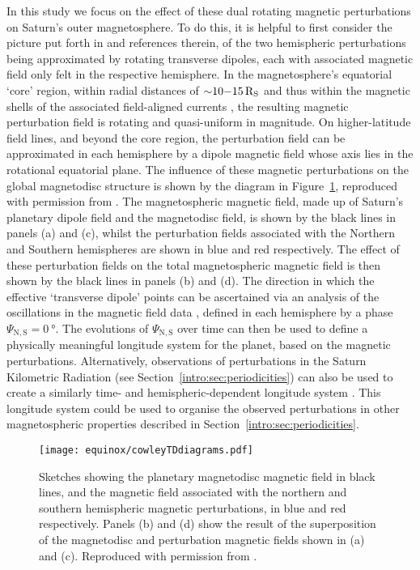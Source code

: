 In this study we focus on the effect of these dual rotating magnetic perturbations on Saturn's outer magnetosphere. To do this, it is helpful to first consider the picture put forth in \citet{andrews2010, provan2011} and references therein, of the two hemispheric perturbations being approximated by rotating transverse dipoles, each with associated magnetic field only felt in the respective hemisphere. In the magnetosphere's equatorial `core' region, within radial distances of ${\sim}10{\--}\SI{15}{R_S}$ and thus within the magnetic shells of the associated field-aligned currents \citep[e.g.][]{southwood2007}, the resulting magnetic perturbation field is rotating and quasi-uniform in magnitude. On higher-latitude field lines, and beyond the core region, the perturbation field can be approximated in each hemisphere by a dipole magnetic field whose axis lies in the rotational equatorial plane. The influence of these magnetic perturbations on the global magnetodisc structure is shown by the diagram in Figure~\ref{equinox:fig:CowleyTDdiagrams}, reproduced with permission from \citet{cowley2017a}. The magnetospheric magnetic field, made up of Saturn's planetary dipole field and the magnetodisc field, is shown by the black lines in panels (a) and (c), whilst the perturbation fields associated with the Northern and Southern hemispheres are shown in blue and red respectively. The effect of these perturbation fields on the total magnetospheric magnetic field is then shown by the black lines in panels (b) and (d). The direction in which the effective `transverse dipole' points can be ascertained via an analysis of the oscillations in the magnetic field data \citep[e.g.][]{provan2009}, defined in each hemisphere by a phase $\Psi_\mathrm{N,S} = \SI{0}{\degree}$. The evolutions of $\Psi_\mathrm{N,S}$ over time can then be used  to define a physically meaningful longitude system for the planet, based on the magnetic perturbations. Alternatively, observations of perturbations in the Saturn Kilometric Radiation (see Section~\ref{intro:sec:periodicities}) can also be used to create a similarly time- and hemispheric-dependent longitude system \citep[e.g.][]{gurnett2011}. This longitude system could be used to organise the observed perturbations in other magnetospheric properties described in Section~\ref{intro:sec:periodicities}. 

\begin{figure}
\centering
\texttt{[image: equinox/cowleyTDdiagrams.pdf]}
\caption[Sketches of hemispheric rotating magnetic perturbation fields, from \citet{cowley2017a}.]{Sketches showing the planetary magnetodisc magnetic field in black lines, and the magnetic field associated with the northern and southern hemispheric magnetic perturbations, in blue and red respectively. Panels (b) and (d) show the result of the superposition of the magnetodisc and perturbation magnetic fields shown in (a) and (c). Reproduced with permission from \citet{cowley2017a}.}
\label{equinox:fig:CowleyTDdiagrams}
\end{figure}

